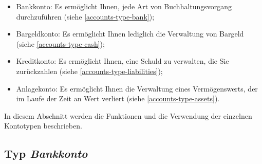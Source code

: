 \begin{itemize}
	\item Bankkonto: Es ermöglicht Ihnen, jede Art von Buchhaltungsvorgang durchzuführen (siehe \vref{accounts-type-bank});
	\item Bargeldkonto: Es ermöglicht Ihnen lediglich die Verwaltung von Bargeld (siehe \vref{accounts-type-cash});
	\item Kreditkonto: Es ermöglicht Ihnen, eine Schuld zu verwalten, die Sie zurückzahlen (siehe \vref{accounts-type-liabilities});
	\item Anlagekonto: Es ermöglicht Ihnen die Verwaltung eines Vermögenswerts, der im Laufe der Zeit an Wert verliert (siehe \vref{accounts-type-assets}).
\end{itemize}

In diesem Abschnitt werden die Funktionen und die Verwendung der einzelnen Kontotypen beschrieben.


\subsection{Typ \emph{Bankkonto}\label{accounts-type-bank}}%

